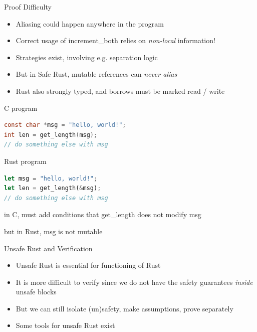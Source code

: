 \documentclass{beamer}
\begin{document}
\begin{frame}{Proof Difficulty}
\begin{itemize}
\item
Aliasing could happen anywhere in the program
\item
Correct usage of increment\_both relies on \emph{non-local} information!
\item
Strategies exist, involving e.g. separation logic
\item But in Safe Rust, mutable references can \emph{never alias}
\item Rust also strongly typed, and borrows must be marked read / write
\end{itemize} 
\end{frame}



\begin{frame}[fragile]
\vspace{3em}
\begin{block}{C program}
\begin{lstlisting}[language=C]
const char *msg = "hello, world!"; 
int len = get_length(msg);
// do something else with msg
\end{lstlisting}
\end{block}

\begin{block}{Rust program}
\begin{lstlisting}[language=rust]
let msg = "hello, world!"; 
let len = get_length(&msg);  
// do something else with msg
\end{lstlisting}
\end{block}


in C, must add conditions that get\_length does not modify 
msg

but in Rust, msg is not mutable
\end{frame}

\begin{frame}{Unsafe Rust and Verification} 
\begin{itemize}
\item 
Unsafe Rust is essential for functioning of Rust 
\item 
It is more difficult to verify since we do not have the safety guarantees \emph{inside} unsafe blocks
\item 
But we can still isolate (un)safety, make assumptions, prove separately
\item 
Some tools for unsafe Rust exist
\end{itemize} 
\end{frame} 
\end{document}
